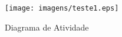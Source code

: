 \begin{figure}[!htb]
        \caption{\label{diagrama1}Diagrama de Atividade}
        \begin{center}
                \texttt{[image: imagens/teste1.eps]}
        \end{center}
\end{figure}

